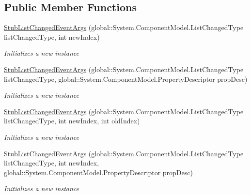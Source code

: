 \subsection*{Public Member Functions}
\begin{DoxyCompactItemize}
\item 
\hyperlink{class_system_1_1_component_model_1_1_fakes_1_1_stub_list_changed_event_args_a6aaa1aacde16803e68b95fbf0f4fcd19}{Stub\-List\-Changed\-Event\-Args} (global\-::\-System.\-Component\-Model.\-List\-Changed\-Type list\-Changed\-Type, int new\-Index)
\begin{DoxyCompactList}\small\item\em Initializes a new instance\end{DoxyCompactList}\item 
\hyperlink{class_system_1_1_component_model_1_1_fakes_1_1_stub_list_changed_event_args_a47e0af8161930af323ceeeba99f35e3f}{Stub\-List\-Changed\-Event\-Args} (global\-::\-System.\-Component\-Model.\-List\-Changed\-Type list\-Changed\-Type, global\-::\-System.\-Component\-Model.\-Property\-Descriptor prop\-Desc)
\begin{DoxyCompactList}\small\item\em Initializes a new instance\end{DoxyCompactList}\item 
\hyperlink{class_system_1_1_component_model_1_1_fakes_1_1_stub_list_changed_event_args_aa9816295fe7441bfef324851e06365dc}{Stub\-List\-Changed\-Event\-Args} (global\-::\-System.\-Component\-Model.\-List\-Changed\-Type list\-Changed\-Type, int new\-Index, int old\-Index)
\begin{DoxyCompactList}\small\item\em Initializes a new instance\end{DoxyCompactList}\item 
\hyperlink{class_system_1_1_component_model_1_1_fakes_1_1_stub_list_changed_event_args_a955a7ca9335697ee39e85ae7949efc4c}{Stub\-List\-Changed\-Event\-Args} (global\-::\-System.\-Component\-Model.\-List\-Changed\-Type list\-Changed\-Type, int new\-Index, global\-::\-System.\-Component\-Model.\-Property\-Descriptor prop\-Desc)
\begin{DoxyCompactList}\small\item\em Initializes a new instance\end{DoxyCompactList}\end{DoxyCompactItemize}
